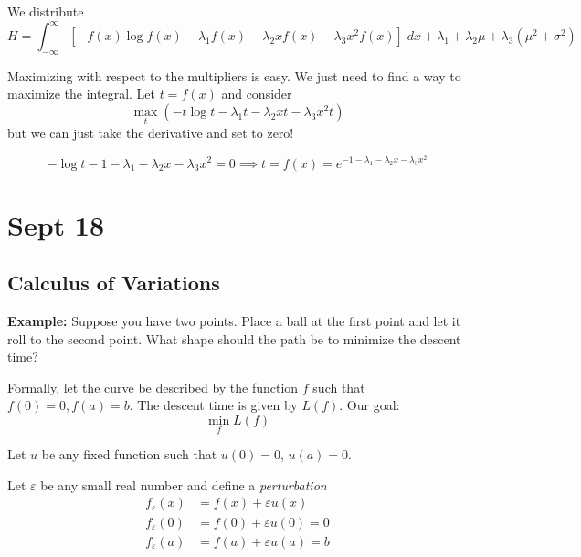 \documentclass[12pt]{report}
\newcommand{\ep}{\varepsilon}
\begin{document}
        We distribute 
        \[H = \int_{-\infty}^{\infty} \left[-f(x)\log f(x) - \lambda_1 f(x) - \lambda_2 xf(x) - \lambda_3 x^2 f(x)\right]\; dx + \lambda_1 + \lambda_2 \mu + \lambda_3(\mu^2 + \sigma^2)\]

        Maximizing with respect to the multipliers is easy. We just need to find a way to maximize the integral. Let $t = f(x)$ and consider 
        \[\max_t \left(-t \log t - \lambda_1 t - \lambda_2xt - \lambda_3 x^2 t\right)\]
        but we can just take the derivative and set to zero! 

        \[-\log t - 1 - \lambda_1 - \lambda_2 x - \lambda_3 x^2 = 0 \implies t = f(x) = e^{-1 - \lambda_1 - \lambda_2 x - \lambda_3 x^2}\]

\section{Sept 18}
\subsection*{Calculus of Variations}
    \textbf{Example:} Suppose you have two points. Place a ball at the first point and let it roll to the second point. What shape should the path be to minimize the descent time? 
       


    Formally, let the curve be described by the function $f$ such that $f(0) =0, f(a) = b$. The descent time is given by $L(f)$. Our goal:
    \[\min_f L(f)\]

    Let $u$ be any fixed function such that $u(0) = 0$, $u(a) = 0$. 

    Let $\ep$ be any small real number and define a \emph{perturbation} 
    \begin{align*}
        f_{\ep}(x) &= f(x) + \ep u(x)\\
        f_{\ep}(0) &= f(0) + \ep u(0) = 0\\
        f_{\ep}(a) &= f(a) + \ep u(a) = b
    \end{align*}
        
\end{document}
